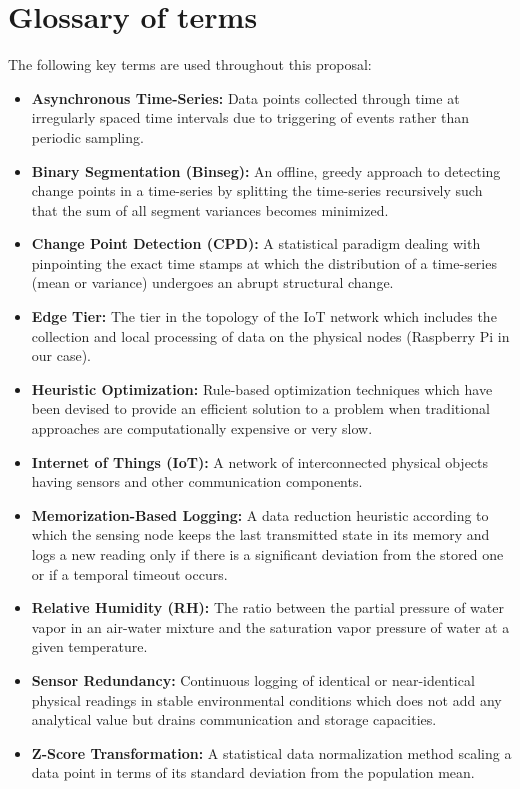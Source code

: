 \documentclass[12pt,a4paper]{report}
\begin{document}
\chapter*{Glossary of terms}
The following key terms are used throughout this proposal:
\begin{itemize}
    \item \textbf{Asynchronous Time-Series:} Data points collected through time at irregularly spaced time intervals due to triggering of events rather than periodic sampling.
    \item \textbf{Binary Segmentation (Binseg):} An offline, greedy approach to detecting change points in a time-series by splitting the time-series recursively such that the sum of all segment variances becomes minimized.
    \item \textbf{Change Point Detection (CPD):} A statistical paradigm dealing with pinpointing the exact time stamps at which the distribution of a time-series (mean or variance) undergoes an abrupt structural change.
    \item \textbf{Edge Tier:} The tier in the topology of the IoT network which includes the collection and local processing of data on the physical nodes (Raspberry Pi in our case).
    \item \textbf{Heuristic Optimization:} Rule-based optimization techniques which have been devised to provide an efficient solution to a problem when traditional approaches are computationally expensive or very slow.
    \item \textbf{Internet of Things (IoT):} A network of interconnected physical objects having sensors and other communication components.
    \item \textbf{Memorization-Based Logging:} A data reduction heuristic according to which the sensing node keeps the last transmitted state in its memory and logs a new reading only if there is a significant deviation from the stored one or if a temporal timeout occurs.
    \item \textbf{Relative Humidity (RH):} The ratio between the partial pressure of water vapor in an air-water mixture and the saturation vapor pressure of water at a given temperature.
    \item \textbf{Sensor Redundancy:} Continuous logging of identical or near-identical physical readings in stable environmental conditions which does not add any analytical value but drains communication and storage capacities.
    \item \textbf{Z-Score Transformation:} A statistical data normalization method scaling a data point in terms of its standard deviation from the population mean.
\end{itemize}









\end{document}
